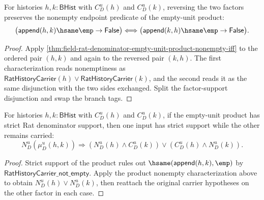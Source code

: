 \begin{theorem}
\label{thm:field-rat-denominator-empty-unit-product-nonempty-comm-iff}
For histories $h,k:\mathsf{BHist}$ with $C_D^u(h)$ and $C_D^u(k)$, reversing
the two factors preserves the nonempty endpoint predicate of the empty-unit
product:
$$
\bigl(\mathsf{append}(h,k)\hsame\emp\to\mathsf{False}\bigr)
\Longleftrightarrow
\bigl(\mathsf{append}(k,h)\hsame\emp\to\mathsf{False}\bigr).
$$
\end{theorem}
\begin{proof}
Apply
\autoref{thm:field-rat-denominator-empty-unit-product-nonempty-iff} to the
ordered pair $(h,k)$ and again to the reversed pair $(k,h)$. The first
characterization reads nonemptiness as
$\mathsf{RatHistoryCarrier}(h)\lor\mathsf{RatHistoryCarrier}(k)$, and the
second reads it as the same disjunction with the two sides exchanged. Split
the factor-support disjunction and swap the branch tags.
\end{proof}

\begin{theorem}
\label{thm:field-rat-denominator-empty-unit-strict-product-factor-cases}
For histories $h,k:\mathsf{BHist}$ with $C_D^u(h)$ and $C_D^u(k)$, if the
empty-unit product has strict Rat denominator support, then one input has
strict support while the other remains carried:
$$
N_D^u(\mu_D^u(h,k))
\Longrightarrow
(N_D^u(h)\wedge C_D^u(k))\lor(C_D^u(h)\wedge N_D^u(k)).
$$
\end{theorem}
\begin{proof}
Strict support of the product rules out $\hsame(\mathsf{append}(h,k),\emp)$ by
$\mathsf{RatHistoryCarrier\_not\_empty}$. Apply the product nonempty
characterization above to obtain $N_D^u(h)\lor N_D^u(k)$, then reattach the
original carrier hypotheses on the other factor in each case.
\end{proof}

